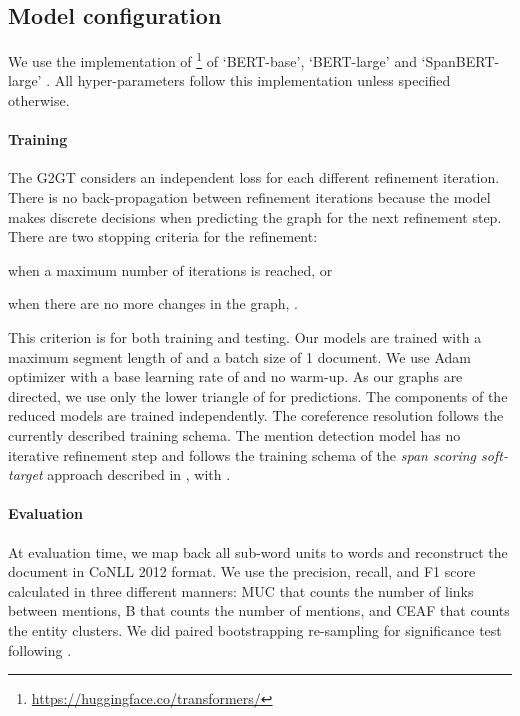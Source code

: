 \documentclass[11pt]{article}
\begin{document}
\subsection{Model configuration}
We use the implementation of \citet{wolf2019huggingface}\footnote{\url{https://huggingface.co/transformers/}} of `BERT-base', `BERT-large' \cite{joshi-etal-2019-bert} and `SpanBERT-large' \cite{joshi-etal-2020-spanbert}. All hyper-parameters follow this implementation unless specified otherwise.  

\paragraph{Training}  The G2GT considers an independent loss for each different refinement iteration. There is no back-propagation between refinement iterations because the model makes discrete decisions when predicting the graph for the next refinement step. There are two stopping criteria for the refinement: 
	\begin{enumerate*}[(\alph*)]
		\item when a maximum number of iterations  is reached, or
		\item when there are no more changes in the graph, . 
	\end{enumerate*}
This criterion  is for both training and testing. 
Our models are trained with a maximum segment length of  and a batch size of 1 document. We use Adam \cite{kingma2014adam, wolf2019huggingface} optimizer with a base learning rate of  and no warm-up. As our graphs are directed, we use only the lower triangle of  for predictions. The components of the reduced models are trained independently. The coreference resolution follows the currently described training schema. The mention detection model has no iterative refinement step and follows the training schema of the \emph{span scoring soft-target} approach described in \cite{miculicich-henderson-2020-partially}, with . 
	
\paragraph{Evaluation}  At evaluation time, we map back all sub-word units to words and reconstruct the document in CoNLL 2012 format. We use the precision, recall, and F1 score calculated in three different manners: MUC that counts the number of links between mentions, B that counts the number of mentions, and CEAF that counts the entity clusters. We did paired bootstrapping re-sampling for significance test following \cite{koehn-2004-statistical}.
\end{document}
